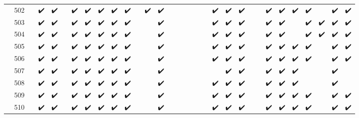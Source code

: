 \begin{tabular}{llcccccccccccccccccccccccccccccc}
 & 502 &  & ✔️ & ✔️ &  & ✔️ & ✔️ & ✔️ & ✔️ & ✔️ &  & ✔️ & ✔️ &  &  &  &  &  &  & ✔️ & ✔️ & ✔️ &  &  & ✔️ & ✔️ & ✔️ & ✔️ &  & ✔️ & ✔️ \\
 & 503 &  & ✔️ & ✔️ &  & ✔️ & ✔️ & ✔️ & ✔️ & ✔️ &  &  & ✔️ &  &  &  &  &  &  & ✔️ & ✔️ & ✔️ &  &  & ✔️ & ✔️ &  & ✔️ & ✔️ & ✔️ & ✔️ \\
 & 504 &  & ✔️ & ✔️ &  & ✔️ & ✔️ & ✔️ & ✔️ & ✔️ &  &  & ✔️ &  &  &  &  &  &  & ✔️ & ✔️ & ✔️ &  &  & ✔️ & ✔️ &  & ✔️ & ✔️ & ✔️ & ✔️ \\
 & 505 &  & ✔️ & ✔️ &  & ✔️ & ✔️ & ✔️ & ✔️ & ✔️ &  &  & ✔️ &  &  &  &  &  &  & ✔️ & ✔️ & ✔️ &  &  & ✔️ & ✔️ & ✔️ & ✔️ &  & ✔️ & ✔️ \\
 & 506 &  & ✔️ & ✔️ &  & ✔️ & ✔️ & ✔️ & ✔️ & ✔️ &  &  & ✔️ &  &  &  &  &  &  & ✔️ & ✔️ & ✔️ &  &  & ✔️ & ✔️ & ✔️ & ✔️ &  & ✔️ & ✔️ \\
 & 507 &  & ✔️ & ✔️ &  & ✔️ & ✔️ & ✔️ & ✔️ & ✔️ &  &  & ✔️ &  &  &  &  &  &  &  & ✔️ & ✔️ &  &  & ✔️ & ✔️ & ✔️ &  &  & ✔️ &  \\
 & 508 &  & ✔️ & ✔️ &  & ✔️ & ✔️ & ✔️ & ✔️ & ✔️ &  &  & ✔️ &  &  &  &  &  &  & ✔️ & ✔️ & ✔️ &  &  & ✔️ & ✔️ & ✔️ &  &  & ✔️ &  \\
 & 509 &  & ✔️ & ✔️ &  & ✔️ & ✔️ & ✔️ & ✔️ & ✔️ &  &  & ✔️ &  &  &  &  &  &  & ✔️ & ✔️ & ✔️ &  &  & ✔️ & ✔️ & ✔️ & ✔️ &  & ✔️ & ✔️ \\
 & 510 &  & ✔️ & ✔️ &  & ✔️ & ✔️ & ✔️ & ✔️ & ✔️ &  &  & ✔️ &  &  &  &  &  &  & ✔️ & ✔️ & ✔️ &  &  & ✔️ & ✔️ & ✔️ & ✔️ &  & ✔️ & ✔️ \\
\cline{1-32}
\bottomrule
\end{tabular}
